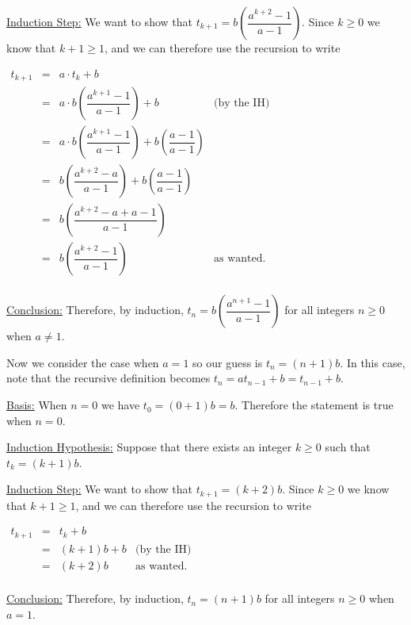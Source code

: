\documentclass[11 pt]{article}%
\begin{document}
\begin{enumerate}
\underline{Induction Step:} We want to show that $t_{k+1} = b \left( \dfrac{a^{k+2} - 1}{a-1}\right)$. Since $k\geq 0$ we know that $k+1\geq 1$, and we can therefore use the recursion to write
\begin{center}
$\begin{array}{cclr}
t_{k+1} & = & a\cdot t_k + b & \\
 & = & a \cdot b \left( \dfrac{a^{k+1} - 1}{a-1}\right) + b & \mbox{(by the IH)} \\
 & = & a \cdot b \left( \dfrac{a^{k+1} - 1}{a-1}\right) + b \left( \dfrac{a-1}{a-1}\right) & \\
 & = & b \left( \dfrac{a^{k+2} - a}{a-1}\right) + b \left( \dfrac{a-1}{a-1}\right) & \\
 & = & b \left( \dfrac{a^{k+2} - a + a -1}{a-1}\right) & \\
 & = & b \left( \dfrac{a^{k+2} -1}{a-1}\right) & \mbox{as wanted}.\\

\end{array}$
\end{center}

\underline{Conclusion:} Therefore, by induction, $t_n = b \left( \dfrac{a^{n+1} - 1}{a-1}\right)$ for all integers $n\geq 0$ when $a\neq 1$.


Now we consider the case when $a=1$ so our guess is $t_n = (n+1)b$. In this case, note that the recursive definition becomes $t_n= a t_{n-1} + b = t_{n-1} + b$.

\underline{Basis:} When $n=0$ we have $t_0 = (0+1)b = b$. Therefore the statement is true when $n=0$.

\underline{Induction Hypothesis:} Suppose that there exists an integer $k\geq 0$ such that $t_k = (k+1)b$.

\underline{Induction Step:} We want to show that $t_{k+1} = (k+2)b$. Since $k\geq 0$ we know that $k+1\geq 1$, and we can therefore use the recursion to write
\begin{center}
$\begin{array}{cclr}
t_{k+1} & = & t_k + b & \\
 & = & (k+1)b+ b & \mbox{(by the IH)} \\
 & = & (k+2)b &  \mbox{as wanted}.\\

\end{array}$
\end{center}

\underline{Conclusion:} Therefore, by induction, $t_n = (n+1)b$ for all integers $n\geq 0$ when $a= 1$.


\end{enumerate}
\end{document}
